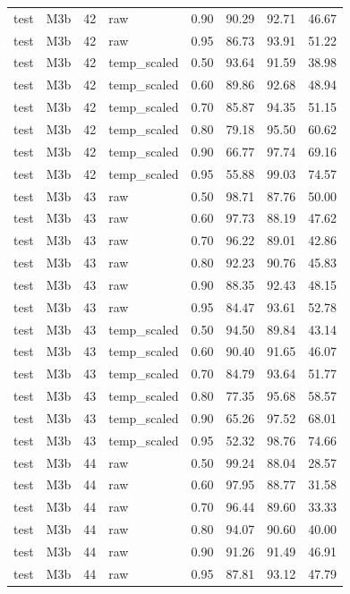 \begin{tabular}{llrlrrrr}
test & M3b & 42 & raw & 0.90 & 90.29 & 92.71 & 46.67 \\
test & M3b & 42 & raw & 0.95 & 86.73 & 93.91 & 51.22 \\
test & M3b & 42 & temp\_scaled & 0.50 & 93.64 & 91.59 & 38.98 \\
test & M3b & 42 & temp\_scaled & 0.60 & 89.86 & 92.68 & 48.94 \\
test & M3b & 42 & temp\_scaled & 0.70 & 85.87 & 94.35 & 51.15 \\
test & M3b & 42 & temp\_scaled & 0.80 & 79.18 & 95.50 & 60.62 \\
test & M3b & 42 & temp\_scaled & 0.90 & 66.77 & 97.74 & 69.16 \\
test & M3b & 42 & temp\_scaled & 0.95 & 55.88 & 99.03 & 74.57 \\
test & M3b & 43 & raw & 0.50 & 98.71 & 87.76 & 50.00 \\
test & M3b & 43 & raw & 0.60 & 97.73 & 88.19 & 47.62 \\
test & M3b & 43 & raw & 0.70 & 96.22 & 89.01 & 42.86 \\
test & M3b & 43 & raw & 0.80 & 92.23 & 90.76 & 45.83 \\
test & M3b & 43 & raw & 0.90 & 88.35 & 92.43 & 48.15 \\
test & M3b & 43 & raw & 0.95 & 84.47 & 93.61 & 52.78 \\
test & M3b & 43 & temp\_scaled & 0.50 & 94.50 & 89.84 & 43.14 \\
test & M3b & 43 & temp\_scaled & 0.60 & 90.40 & 91.65 & 46.07 \\
test & M3b & 43 & temp\_scaled & 0.70 & 84.79 & 93.64 & 51.77 \\
test & M3b & 43 & temp\_scaled & 0.80 & 77.35 & 95.68 & 58.57 \\
test & M3b & 43 & temp\_scaled & 0.90 & 65.26 & 97.52 & 68.01 \\
test & M3b & 43 & temp\_scaled & 0.95 & 52.32 & 98.76 & 74.66 \\
test & M3b & 44 & raw & 0.50 & 99.24 & 88.04 & 28.57 \\
test & M3b & 44 & raw & 0.60 & 97.95 & 88.77 & 31.58 \\
test & M3b & 44 & raw & 0.70 & 96.44 & 89.60 & 33.33 \\
test & M3b & 44 & raw & 0.80 & 94.07 & 90.60 & 40.00 \\
test & M3b & 44 & raw & 0.90 & 91.26 & 91.49 & 46.91 \\
test & M3b & 44 & raw & 0.95 & 87.81 & 93.12 & 47.79 \\

\end{tabular}
